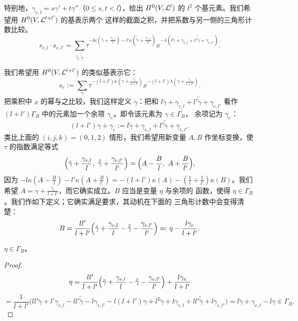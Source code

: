 
特别地，$\gamma_{e,l}=s\gamma'+t\gamma''$（$0\le s,t<l$），给出
$H^0(V,\mathcal{L}^l)$ 的 $l^2$ 个基元素。我们希望用 $H^0(V,\mathcal{L}^{l+l'})$ 的基表示两个
这样的截面之积，并把系数与另一侧的三角形计数比较。
\[
s_{e,l}\cdot s_{e,l'}=\sum_{\tilde\gamma,\tilde{\tilde\gamma}}
\tau^{-l\kappa(\tilde\gamma+\frac{\gamma_{e,l}}{l})
-l'\kappa(\tilde{\tilde\gamma}+\frac{\gamma_{e,l'}}{l'})}
x^{-\lambda(l\tilde\gamma+\gamma_{e,l}+l'\tilde{\tilde\gamma}+\gamma_{e,l'})}.
\]

我们希望用 $H^0(V,\mathcal{L}^{l+l'})$ 的类似基表示它：
\[
s_e:=\sum_\gamma\tau^{-(l+l')\kappa(\gamma+\frac{\gamma_e}{l+l'})}
x^{-(l+l')\lambda(\gamma+\frac{\gamma_e}{l+l'})}.
\]
把乘积中 $x$ 的幂与之比较，我们这样定义 $\gamma$：把和
$l\tilde\gamma+\gamma_{e,l}+l'\tilde{\tilde\gamma}+\gamma_{e,l'}$ 看作
$(l+l')\Gamma_B$ 中的元素加一个余项 $\gamma_e$。即令该元素为 $\gamma\in\Gamma_B$，
余项记为 $\gamma_e$：
\[
(l+l')\gamma+\gamma_e:=l\tilde\gamma+\gamma_{e,l}
+l'\tilde{\tilde\gamma}+\gamma_{e,l'}.
\]
类比上面的 $(i,j,k)=(0,1,2)$ 情形，我们希望用新变量 $A,B$ 作坐标变换，使 $\tau$
的指数满足等式
\[
\Bigl(\tilde\gamma+\frac{\gamma_{e,l}}{l},\ 
\tilde{\tilde\gamma}+\frac{\gamma_{e,l'}}{l'}\Bigr)
=\Bigl(A-\frac{B}{l},\ A+\frac{B}{l'}\Bigr),
\]
因为
$-l\kappa(A-\frac{B}{l})-l'\kappa(A+\frac{B}{l'})
=-(l+l')\kappa(A)-(\frac1l+\frac1{l'})\kappa(B)$。我们希望
$A=\gamma+\frac{\gamma_e}{l+l'}$，而它确实成立。$B$ 应当是变量 $\eta$ 与余项的
函数，使得 $\eta\in\Gamma_B$。我们作如下定义；它确实满足要求，其动机在下面的
三角形计数中会变得清楚：
\[
B=\frac{ll'}{l+l'}\Bigl(\tilde\gamma+\frac{\gamma_{e,l}}{l}
-\tilde{\tilde\gamma}-\frac{\gamma_{e,l'}}{l'}\Bigr)
=:\eta-\frac{l\gamma_e}{l+l'}.
\]

\begin{claim}\label{claim:eta-lattice}
$\eta\in\Gamma_B$。
\end{claim}

\begin{proof}
\[
\eta=\frac{ll'}{l+l'}\Bigl(\tilde\gamma+\frac{\gamma_{e,l}}{l}
-\tilde{\tilde\gamma}-\frac{\gamma_{e,l'}}{l'}\Bigr)+\frac{l\gamma_e}{l+l'}
\]
\[
=\frac{1}{l+l'}\bigl(ll'\tilde\gamma+l'\gamma_{e,l}
-ll'\tilde{\tilde\gamma}-l\gamma_{e,l'}-l(l+l')\gamma
+l^2\tilde\gamma+l\gamma_{e,l}+ll'\tilde{\tilde\gamma}+l\gamma_{e,l'}\bigr)
=l\tilde\gamma+\gamma_{e,l}-l\gamma\in\Gamma_B.
\]
\end{proof}

